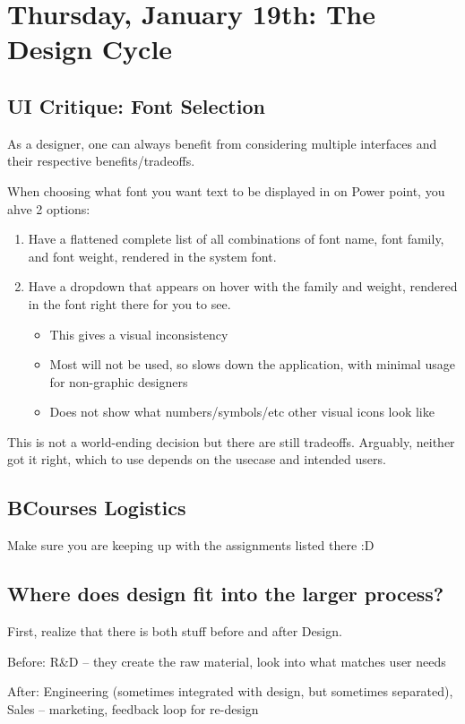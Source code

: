 \section{Thursday, January 19th: The Design Cycle}
\subsection{UI Critique: Font Selection}
As a designer, one can always benefit from considering multiple interfaces and their respective benefits/tradeoffs.

When choosing what font you want text to be displayed in on Power point, you ahve 2 options:

\begin{enumerate}
    \item Have a flattened complete list of all combinations of font name, font family, and font weight, rendered in the system font.
    \item Have a dropdown that appears on hover with the family and weight, rendered in the font right there for you to see.
    \begin{itemize}
        \item This gives a visual inconsistency
        \item Most will not be used, so slows down the application, with minimal usage for non-graphic designers
        \item Does not show what numbers/symbols/etc other visual icons look like
    \end{itemize}
\end{enumerate}
This is not a world-ending decision but there are still tradeoffs. Arguably, neither got it right, which to use depends on the usecase and intended users.

\subsection{BCourses Logistics}
Make sure you are keeping up with the assignments listed there :D

\subsection{Where does design fit into the larger process?}
First, realize that there is both stuff before and after Design.

Before: R\&D -- they create the raw material, look into what matches user needs

After: Engineering (sometimes integrated with design, but sometimes separated), Sales -- marketing, feedback loop for re-design

